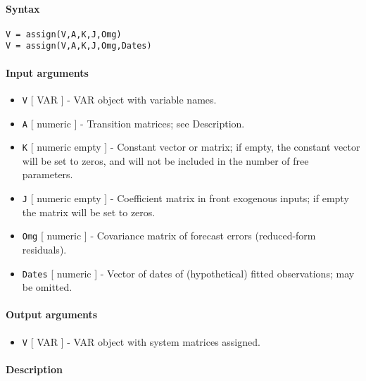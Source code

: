 


	\paragraph{Syntax}\label{syntax}

\begin{verbatim}
V = assign(V,A,K,J,Omg)
V = assign(V,A,K,J,Omg,Dates)
\end{verbatim}

\paragraph{Input arguments}\label{input-arguments}

\begin{itemize}
\item
  \texttt{V} {[} VAR {]} - VAR object with variable names.
\item
  \texttt{A} {[} numeric {]} - Transition matrices; see Description.
\item
  \texttt{K} {[} numeric \textbar{} empty {]} - Constant vector or
  matrix; if empty, the constant vector will be set to zeros, and will
  not be included in the number of free parameters.
\item
  \texttt{J} {[} numeric \textbar{} empty {]} - Coefficient matrix in
  front exogenous inputs; if empty the matrix will be set to zeros.
\item
  \texttt{Omg} {[} numeric {]} - Covariance matrix of forecast errors
  (reduced-form residuals).
\item
  \texttt{Dates} {[} numeric {]} - Vector of dates of (hypothetical)
  fitted observations; may be omitted.
\end{itemize}

\paragraph{Output arguments}\label{output-arguments}

\begin{itemize}
\itemsep1pt\parskip0pt
\item
  \texttt{V} {[} VAR {]} - VAR object with system matrices assigned.
\end{itemize}

\paragraph{Description}\label{description}

